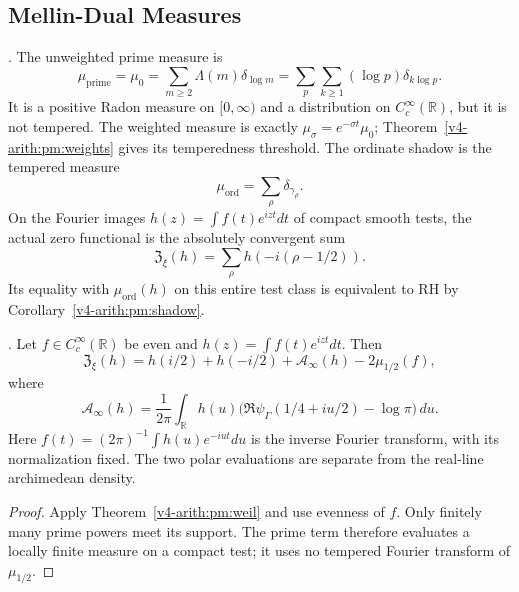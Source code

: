 

\subsection{Mellin-Dual Measures}
\label{v4-arith:w9-r4:mh:mellin-dual}

\begin{definition}
\label{v4-arith:w9-r4:def:counting-measures}
\ClaimStatusDefinitional. The unweighted prime measure is
\begin{equation}
\label{v4-arith:w9-r4:eq:mu-prime}
 \mu_{\mathrm{prime}}=\mu_0
 =\sum_{m\geq2}\Lambda(m)\delta_{\log m}
 =\sum_p\sum_{k\geq1}(\log p)\delta_{k\log p}.
\end{equation}
It is a positive Radon measure on $[0,\infty)$ and a distribution
on $C_c^\infty(\mathbb R)$, but it is not tempered.
The weighted measure is exactly $\mu_\sigma=e^{-\sigma t}\mu_0$;
Theorem~\ref{v4-arith:pm:weights} gives its temperedness threshold.
The ordinate shadow is the tempered measure
\begin{equation}
\label{v4-arith:w9-r4:eq:mu-zero}
 \mu_{\mathrm{ord}}=\sum_\rho\delta_{\gamma_\rho}.
\end{equation}
On the Fourier images $h(z)=\int f(t)e^{izt}dt$ of compact smooth
tests, the actual zero functional is the absolutely convergent sum
\[
 \mathfrak Z_\xi(h)=\sum_\rho h(-i(\rho-1/2)).
\]
Its equality with $\mu_{\mathrm{ord}}(h)$ on this entire test
class is equivalent to RH by Corollary~\ref{v4-arith:pm:shadow}.
\end{definition}

\begin{proposition}
\label{v4-arith:w9-r4:prop:mellin-dual}
\ClaimStatusProvedHere. Let $f\in C_c^\infty(\mathbb R)$ be even
and $h(z)=\int f(t)e^{izt}dt$. Then
\begin{equation}
\label{v4-arith:w9-r4:eq:mellin-dual}
 \mathfrak Z_\xi(h)=h(i/2)+h(-i/2)+\mathcal A_\infty(h)
                         -2\mu_{1/2}(f),
\end{equation}
where
\[
 \mathcal A_\infty(h)=\frac1{2\pi}\int_{\mathbb R}
 h(u)\bigl(\Re\psi_\Gamma(1/4+iu/2)-\log\pi\bigr)\,du.
\]
Here $f(t)=(2\pi)^{-1}\int h(u)e^{-iut}du$ is the inverse Fourier
transform, with its normalization fixed. The two polar evaluations
are separate from the real-line archimedean density.
\end{proposition}
\begin{proof}
Apply Theorem~\ref{v4-arith:pm:weil} and use evenness of $f$.
Only finitely many prime powers meet its support. The prime term
therefore evaluates a locally finite measure on a compact test;
it uses no tempered Fourier transform of $\mu_{1/2}$.
\end{proof}

